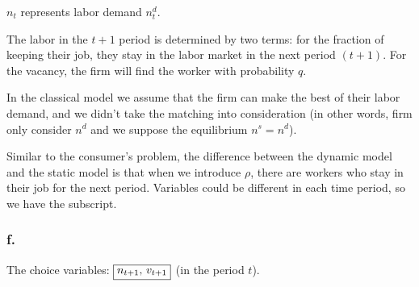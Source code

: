 \documentclass{article}
\begin{document}

$n_{t}$ represents labor demand $n^{d}_{t}$.

The labor in the $t+1$ period is determined by two terms: for the fraction of keeping their job, they stay in the labor market in the next period $(t+1)$. For the vacancy, the firm will find the worker with probability $q$. 

In the classical model we assume that the firm can make the best of their labor demand, and we didn't take the matching into consideration (in other words, firm only consider $n^{d}$ and we suppose the equilibrium $n^{s}=n^{d}$).

Similar to the consumer's problem, the difference between the dynamic model and the static model is that when we introduce $\rho$, there are workers who stay in their job for the next period. Variables could be different in each time period, so we have the subscript.

\subsubsection*{f.}


The choice variables: $\boxed{n_{t+1}$, $v_{t+1}}$ (in the period $t$).
\end{document}
